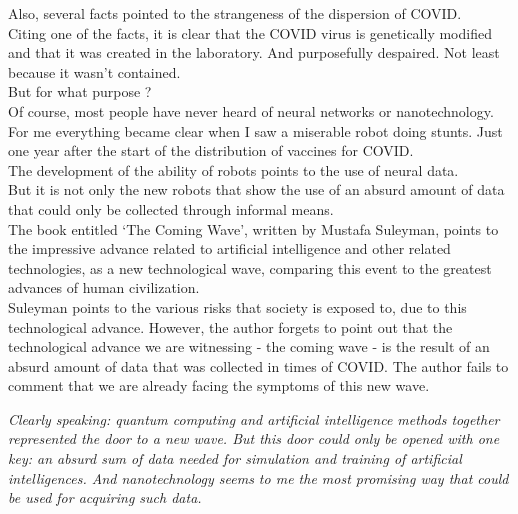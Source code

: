 \documentclass[11pt]{book}
\begin{document}
\noindent Also, several facts pointed to the strangeness of the dispersion of COVID. \\

\noindent Citing one of the facts, it is clear that the COVID virus is genetically modified and that it was created in the laboratory. And purposefully despaired. Not least because it wasn't contained. \\

\noindent But for what purpose ? \\

\noindent Of course, most people have never heard of neural networks or nanotechnology. \\

\noindent For me everything became clear when I saw a miserable robot doing stunts. Just one year after the start of the distribution of vaccines for COVID. \\

\noindent The development of the ability of robots points to the use of neural data. \\

\noindent But it is not only the new robots that show the use of an absurd amount of data that could only be collected through informal means. \\

\noindent The book entitled ‘The Coming Wave', written by Mustafa Suleyman, points to the impressive advance related to artificial intelligence and other related technologies, as a new technological wave, comparing this event to the greatest advances of human civilization. \\

\noindent Suleyman points to the various risks that society is exposed to, due to this technological advance. However, the author forgets to point out that the technological advance we are witnessing - the coming wave - is the result of an absurd amount of data that was collected in times of COVID.  The author fails to comment that we are already facing the symptoms of this new wave.

\noindent \begin{center} \emph{Clearly speaking: quantum computing and artificial intelligence methods together represented the door to a new wave. But this door could only be opened with one key: an absurd sum of data needed for simulation and training of artificial intelligences. And nanotechnology seems to me the most promising way that could be used for acquiring such data.} \end{center}
\end{document}
